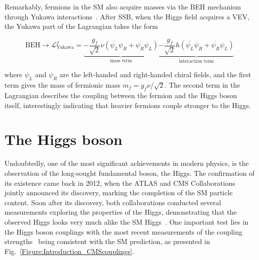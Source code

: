 Remarkably, fermions in the SM also acquire masses via the BEH mechanism through Yukawa interactions~\cite{YukawaInteractions}. After SSB, when the Higgs field acquires a VEV, the Yukawa part of the Lagrangian takes the form

\begin{equation}
    \text{BEH} \rightarrow \mathcal{L}_{\text{Yukawa}}^f = \underbrace{-\frac{g_f}{\sqrt{2}}\nu(\overline{\psi_L}\psi_R + \overline{\psi_R} \psi_L)}_{\text{mass term}} \underbrace{- \frac{g_f}{\sqrt{2}}h(\overline{\psi_L}\psi_R + \overline{\psi_R} \psi_L)}_{\text{interaction term}}
\end{equation}

where $\psi_L$ and $\psi_R$ are the left-handed and right-handed chiral fields, and the first term gives the mass of fermionic mass $m_f = g_f\nu / \sqrt{2}$. The second term in the Lagrangian describes the coupling between the fermion and the Higgs boson itself, interestingly indicating that heavier fermions couple stronger to the Higgs.

\section{The Higgs boson}

Undoubtedly, one of the most significant achievements in modern physics, is the observation of the long-sought fundamental boson, the Higgs. The confirmation of its existence came back in 2012, when the ATLAS and CMS Collaborations~\cite{Higgs_ATLAS,Higgs_CMS} jointly announced its discovery, marking the completion of the SM particle content. Soon after its discovery, both collaborations conducted several measurements exploring the properties of the Higgs, demonstrating that the observed Higgs looks very much alike the SM Higgs~\cite{HiggsParity_1,HiggsParity_2}. One important test lies in the Higgs boson couplings with the most recent measurements of the coupling strengths~\cite{CMS_Couplings_Measurement} being consistent with the SM prediction, as presented in Fig.~\ref{Figure:Introduction_CMScouplings}.


